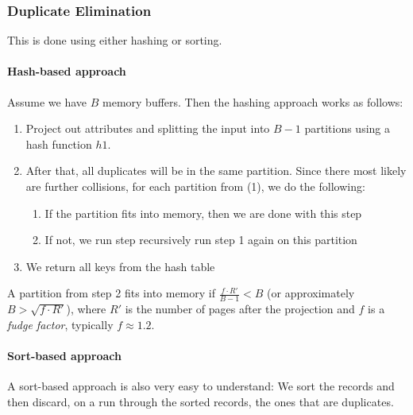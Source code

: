 \subsubsection{Duplicate Elimination}
This is done using either hashing or sorting.

\paragraph{Hash-based approach}
Assume we have $B$ memory buffers.
Then the hashing approach works as follows:
\begin{enumerate}
    \item Project out attributes and splitting the input into $B - 1$ partitions using a hash function $h1$.
    \item After that, all duplicates will be in the same partition. Since there most likely are further collisions, for each partition from (1), we do the following:
          \begin{enumerate}
              \item If the partition fits into memory, then we are done with this step
              \item If not, we run step recursively run step 1 again on this partition
          \end{enumerate}
    \item We return all keys from the hash table
\end{enumerate}
A partition from step 2 fits into memory if $\frac{f \cdot R'}{B - 1} < B$ (or approximately $B > \sqrt{f \cdot R'}$),
where $R'$ is the number of pages after the projection and $f$ is a \textit{fudge factor}, typically $f \approx 1.2$.


\paragraph{Sort-based approach}
A sort-based approach is also very easy to understand: We sort the records and then discard, on a run through the sorted records, the ones that are duplicates.

